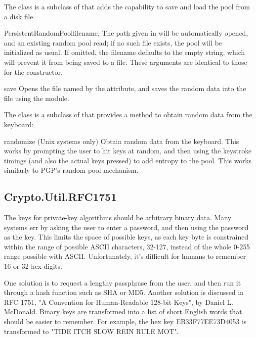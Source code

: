 \documentclass{howto}
\begin{document}
The  class is a subclass of  
that adds the capability to save and load the pool from a disk file.

\begin{classdesc}{PersistentRandomPool}{filename, }
The path given in  will be automatically opened, and an
existing random pool read; if no such file exists, the pool will be
initialized as usual.  If omitted, the filename defaults to the empty
string, which will prevent it from being saved to a file.  These
arguments are identical to those for the 
constructor.
\end{classdesc}

\begin{methoddesc}{save}{}
Opens the file named by the  attribute, and saves the
random data into the file using the  module.
\end{methoddesc}

The  class is a subclass of
 that provides a method to obtain random
data from the keyboard:

\begin{methoddesc}{randomize}{}
(Unix systems only)  Obtain random data from the keyboard.  This works
by prompting the
user to hit keys at random, and then using the keystroke timings (and
also the actual keys pressed) to add entropy to the pool.  This works
similarly to PGP's random pool mechanism.
\end{methoddesc}


\subsection{Crypto.Util.RFC1751}
The keys for private-key algorithms should be arbitrary binary data.
Many systems err by asking the user to enter a password, and then
using the password as the key.  This limits the space of possible
keys, as each key byte is constrained within the range of possible
ASCII characters, 32-127, instead of the whole 0-255 range possible
with ASCII.  Unfortunately, it's difficult for humans to remember 16
or 32 hex digits.

One solution is to request a lengthy passphrase from the user, and
then run it through a hash function such as SHA or MD5.  Another
solution is discussed in RFC 1751, "A Convention for Human-Readable
128-bit Keys", by Daniel L. McDonald.  Binary keys are transformed
into a list of short English words that should be easier to remember.
For example, the hex key EB33F77EE73D4053 is transformed to "TIDE ITCH
SLOW REIN RULE MOT".
\end{document}
